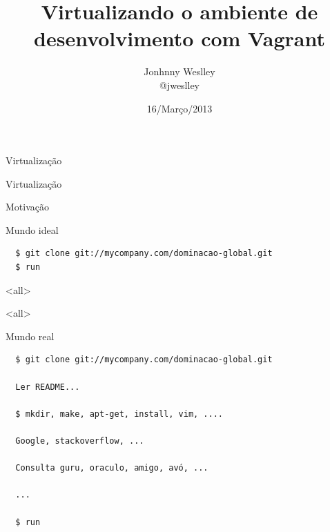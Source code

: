 \documentclass{beamer}
\author{Jonhnny Weslley \\ @jweslley}
\title{Virtualizando o ambiente de desenvolvimento com Vagrant}
\institute{Gurupi \\ Grupo de Usuários de Ruby do Piauí}
\date{16/Março/2013}
\begin{document}
\begin{frame}[t,plain]
\titlepage
\end{frame}

\begin{frame}[plain,c]
  \begin{center}
    \Huge Virtualização
  \end{center}
\end{frame}

\begin{frame}[plain,c]
  \begin{center}
    \Huge Virtualização
  \end{center}
  \begin{center}
    Motivação
  \end{center}
\end{frame}

\begin{frame}[fragile]{Mundo ideal}
  \begin{verbatim}
  $ git clone git://mycompany.com/dominacao-global.git
  $ run
  \end{verbatim}
\end{frame}

\mode<all>
{
\begin{frame}[plain]
\end{frame}}
\mode<all>{\usebackgroundtemplate{}}
\mode*

\begin{frame}[fragile]{Mundo real}
  \begin{verbatim}
  $ git clone git://mycompany.com/dominacao-global.git

  Ler README...

  $ mkdir, make, apt-get, install, vim, ....

  Google, stackoverflow, ...

  Consulta guru, oraculo, amigo, avó, ...

  ...

  $ run
  \end{verbatim}
\end{frame}
\end{document}
